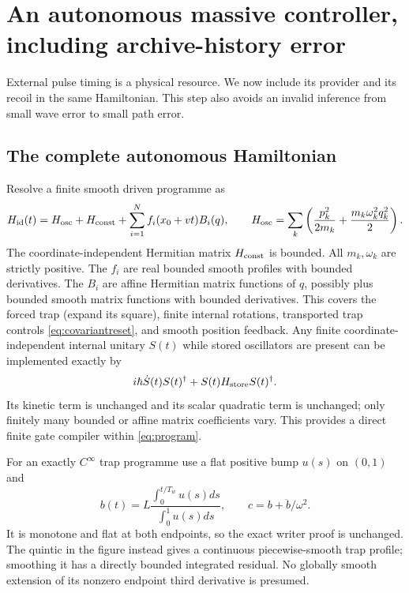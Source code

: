\documentclass[11pt]{article}
\theoremstyle{definition}\newtheorem{assumption}[theorem]{Constitutive assumption}
\theoremstyle{remark}\newtheorem{remark}[theorem]{Remark}
\begin{document}
\section{An autonomous massive controller, including archive-history error}
\label{sec:clock}
External pulse timing is a physical resource. We now include its provider and its recoil in the same Hamiltonian. This step also avoids an invalid inference from small wave error to small path error.

\subsection{The complete autonomous Hamiltonian}
Resolve a finite smooth driven programme as
\begin{equation}\label{eq:program}
 H_{\rm id}(t)=H_{\rm osc}+H_{\rm const}+\sum_{i=1}^N f_i(x_0+vt)B_i(q),
 \qquad H_{\rm osc}=\sum_k\left(\frac{p_k^2}{2m_k}
                         +\frac{m_k\omega_k^2q_k^2}{2}\right).
\end{equation}
The coordinate-independent Hermitian matrix $H_{\rm const}$ is bounded. All $m_k,\omega_k$ are strictly positive. The $f_i$ are real bounded smooth profiles with bounded derivatives. The $B_i$ are affine Hermitian matrix functions of $q$, possibly plus bounded smooth matrix functions with bounded derivatives. This covers the forced trap (expand its square), finite internal rotations, transported trap controls \eqref{eq:covariantreset}, and smooth position feedback. Any finite coordinate-independent internal unitary $S(t)$ while stored oscillators are present can be implemented exactly by
\[
 i\hbar\dot S(t)S(t)^\dagger+S(t)H_{\rm store}S(t)^\dagger.
\]
Its kinetic term is unchanged and its scalar quadratic term is unchanged; only finitely many bounded or affine matrix coefficients vary. This provides a direct finite gate compiler within \eqref{eq:program}.

For an exactly $C^\infty$ trap programme use a flat positive bump $u(s)$ on $(0,1)$ and
\[
 b(t)=L\frac{\int_0^{t/T_w}u(s)ds}{\int_0^1u(s)ds},\qquad
 c=b+\ddot b/\omega^2.
\]
It is monotone and flat at both endpoints, so the exact writer proof is unchanged. The quintic in the figure instead gives a continuous piecewise-smooth trap profile; smoothing it has a directly bounded integrated residual. No globally smooth extension of its nonzero endpoint third derivative is presumed.
\end{document}
